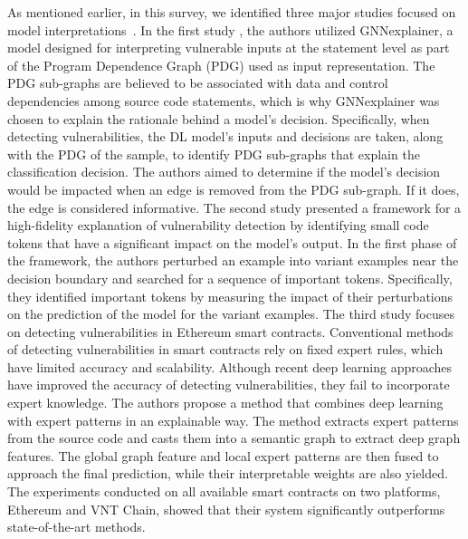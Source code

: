 As mentioned earlier, in this survey, we identified three major studies focused on model interpretations~\cite{3429444, li2021vulnerability,liu2021smart}. In the first study \cite{3429444}, the authors utilized GNNexplainer, a model designed for interpreting vulnerable inputs at the statement level as part of the Program Dependence Graph (PDG) used as input representation. The PDG sub-graphs are believed to be associated with data and control dependencies among source code statements, which is why GNNexplainer \cite{ying2019gnnexplainer} was chosen to explain the rationale behind a model's decision. Specifically, when detecting vulnerabilities, the DL model's inputs and decisions are taken, along with the PDG of the sample, to identify PDG sub-graphs that explain the classification decision. The authors aimed to determine if the model's decision would be impacted when an edge is removed from the PDG sub-graph. If it does, the edge is considered informative.
The second study \cite{li2021vulnerability} presented a framework for a high-fidelity explanation of vulnerability detection by identifying small code tokens that have a significant impact on the model's output. In the first phase of the framework, the authors perturbed an example into variant examples near the decision boundary and searched for a sequence of important tokens. Specifically, they identified important tokens by measuring the impact of their perturbations on the prediction of the model for the variant examples. 
The third study \cite{liu2021smart} focuses on detecting vulnerabilities in Ethereum smart contracts. Conventional methods of detecting vulnerabilities in smart contracts rely on fixed expert rules, which have limited accuracy and scalability. Although recent deep learning approaches have improved the accuracy of detecting vulnerabilities, they fail to incorporate expert knowledge. The authors propose a method that combines deep learning with expert patterns in an explainable way. The method extracts expert patterns from the source code and casts them into a semantic graph to extract deep graph features. The global graph feature and local expert patterns are then fused to approach the final prediction, while their interpretable weights are also yielded. The experiments conducted on all available smart contracts on two platforms, Ethereum and VNT Chain, showed that their system significantly outperforms state-of-the-art methods. 


